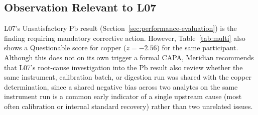 \subsection{Observation Relevant to L07}
L07's Unsatisfactory Pb result (Section~\ref{sec:performance-evaluation}) is the finding requiring
mandatory corrective action. However, Table~\ref{tab:multi} also shows a Questionable score for
copper (\(z = -2.56\)) for the same participant. Although this does not on its own trigger a
formal CAPA, Meridian recommends that L07's root-cause investigation into the Pb result also
review whether the same instrument, calibration batch, or digestion run was shared with the
copper determination, since a shared negative bias across two analytes on the same instrument run
is a common early indicator of a single upstream cause (most often calibration or internal
standard recovery) rather than two unrelated issues.
